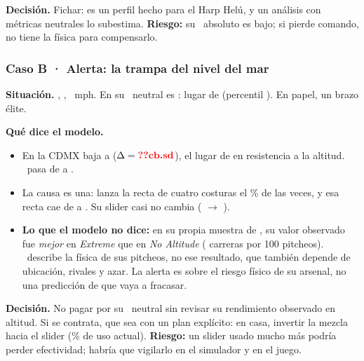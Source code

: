 \begin{table}[H]\centering\small
\caption{Caso A: arsenal .}\label{anx:tab:ca}
\end{table}

\textbf{Decisión.} Fichar: es un perfil hecho para el Harp Helú, y un análisis con métricas neutrales lo subestima. \textbf{Riesgo:} su \splus\ absoluto es bajo; si pierde comando, no tiene la física para compensarlo.

\subsubsection{Caso B · Alerta: la trampa del nivel del mar}

\textbf{Situación.} , , ~mph. En  su \splus\ neutral es : lugar  de  (percentil ). En papel, un brazo élite.

\textbf{Qué dice el modelo.}
\begin{itemize}
  \item En la CDMX baja a  ($\Delta=\cf{cb.sd}$), el lugar  de  en resistencia a la altitud. \pplus\ pasa de  a .
  \item La causa es una: lanza la recta de cuatro costuras el \% de las veces, y esa recta cae de  a . Su slider casi no cambia ( $\to$ ).
  \item \textbf{Lo que el modelo no dice:} en su propia muestra de , su valor observado fue \emph{mejor} en \emph{Extreme} que en \emph{No Altitude} ( carreras por 100 pitcheos). \splus\ describe la física de sus pitcheos, no ese resultado, que también depende de ubicación, rivales y azar. La alerta es sobre el riesgo físico de su arsenal, no una predicción de que vaya a fracasar.
\end{itemize}

\begin{table}[H]\centering\small
\caption{Caso B: arsenal .}\label{anx:tab:cb}
\end{table}

\textbf{Decisión.} No pagar por su \splus\ neutral sin revisar su rendimiento observado en altitud. Si se contrata, que sea con un plan explícito: en casa, invertir la mezcla hacia el slider (\% de uso actual). \textbf{Riesgo:} un slider usado mucho más podría perder efectividad; habría que vigilarlo en el simulador y en el juego.

